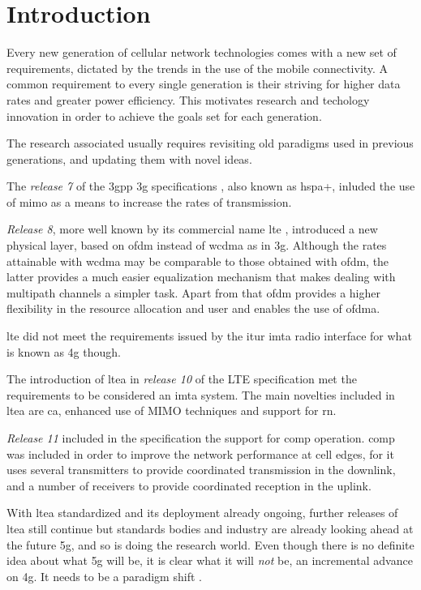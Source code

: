\chapter{Introduction}\label{ch:intro}

Every new generation of cellular network technologies comes with a new set of
requirements, dictated by the trends in the use of the mobile connectivity. A
common requirement to every single generation is their striving for higher data
rates and greater power efficiency. This motivates research and techology
innovation in order to achieve the goals set for each generation.


The research associated usually requires revisiting old paradigms used in
previous generations, and updating them with novel ideas.


The \emph{release 7} of the \gls{3gpp} \gls{3g} specifications \cite{3gpprel7},
also known as \gls{hspa+}, inluded the use of \gls{mimo} as a means to increase
the rates of transmission.


\emph{Release 8}, more well known by its commercial name \gls{lte}
\cite{3gpplte}, introduced a new physical layer, based on \gls{ofdm} instead of
\gls{wcdma} as in \gls{3g}. Although the rates attainable with \gls{wcdma} may
be comparable to those obtained with \gls{ofdm}, the latter provides a much
easier equalization mechanism that makes dealing with multipath channels a
simpler task. Apart from that \gls{ofdm} provides a higher flexibility in the
resource allocation and user and enables the use of \gls{ofdma}.

\gls{lte} did not meet the requirements issued by the \gls{itur} \gls{imta}
radio interface \cite{imta} for what is known as \gls{4g} though.

The introduction of \gls{ltea} in \emph{release 10} of the LTE specification
\cite{3gppltea} met the requirements to be considered an \gls{imta} system. The
main novelties included in \gls{ltea} are \gls{ca}, enhanced use of MIMO
techniques and support for \gls{rn}.

\emph{Release 11} \cite{3gpprel11} included in the specification the support for
\gls{comp} operation. \gls{comp} was included in order to improve the network
performance at cell edges, for it uses several transmitters to provide
coordinated transmission in the downlink, and a number of receivers to provide
coordinated reception in the uplink.

With \gls{ltea} standardized and its deployment already ongoing, further
releases of \gls{ltea} still continue but standards bodies and industry are
already looking ahead at the future \gls{5g}, and so is doing the research
world. Even though there is no definite idea about what \gls{5g} will be, it is 
clear what it will \emph{not} be, an incremental advance on \gls{4g}. It needs
to be a paradigm shift \cite{andrews14}.

